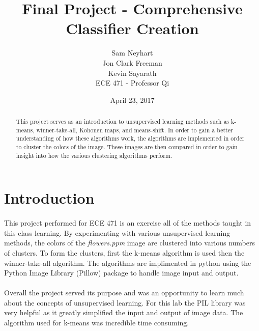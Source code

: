 \documentclass{article}
\begin{document}
\title{Final Project - Comprehensive Classifier Creation}
\author{Sam Neyhart\\ Jon Clark Freeman\\ Kevin Sayarath\\ ECE 471 - Professor Qi}
\date{April 23, 2017}
\maketitle
\newpage


\begin{abstract}
This project serves as an introduction to unsupervised learning methods 
such as k-means, winner-take-all, Kohonen maps, and means-shift. In order
to gain a better understanding of how these algorithms work, the algorithms
are implemented in order to cluster the colors of the image. These images
are then compared in order to gain insight into how the various clustering
algorithms perform.
\end{abstract}
\newpage


\section*{Introduction}
\paragraph{}
This project performed for ECE 471 is an exercise all of the methods taught in this class learning.
By experimenting with various unsupervised learning methods, the colors
of the \textit{flowers.ppm} image are clustered into various numbers of clusters.
To form the clusters, first the k-means algorithm is used then the 
winner-take-all algorithm. The algorithms are implimented in python
using the Python Image Library (Pillow) package to handle image input and 
output.

\paragraph{} 
Overall the project served its purpose and was an opportunity to learn
much about the concepts of unsupervised learning. For this lab the 
PIL library was very helpful as it greatly simplified the input and output
of image data. The algorithm used for k-means was incredible time consuming.
\newpage
\end{document}
